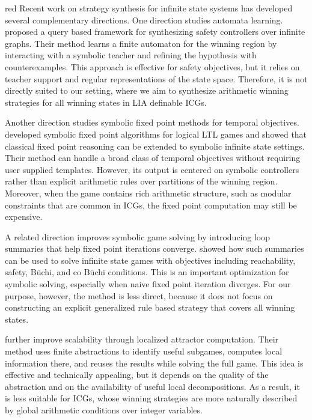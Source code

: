 \documentclass[review]{elsarticle}
\begin{document}
\begin{color}{red}
Recent work on strategy synthesis for infinite state systems has developed several complementary directions. One direction studies automata learning. 
\citet{NeiT2016} proposed a query based framework for synthesizing safety controllers over infinite graphs. 
Their method learns a finite automaton for the winning region by interacting with a symbolic teacher and refining the hypothesis with counterexamples. 
This approach is effective for safety objectives, but it relies on teacher support and regular representations of the state space. 
Therefore, it is not directly suited to our setting, where we aim to synthesize arithmetic winning strategies for all winning states in LIA definable ICGs.

Another direction studies symbolic fixed point methods for temporal objectives. 
\citet{StaDK2023} developed symbolic fixed point algorithms for logical LTL games and showed that classical fixed point reasoning can be extended to symbolic infinite state settings. 
Their method can handle a broad class of temporal objectives without requiring user supplied templates. 
However, its output is centered on symbolic controllers rather than explicit arithmetic rules over partitions of the winning region. 
Moreover, when the game contains rich arithmetic structure, such as modular constraints that are common in ICGs, the fixed point computation may still be expensive.

A related direction improves symbolic game solving by introducing loop summaries that help fixed point iterations converge. 
\citet{HeiR2024} showed how such summaries can be used to solve infinite state games with objectives including reachability, safety, B\"uchi, and co B\"uchi conditions. 
This is an important optimization for symbolic solving, especially when naive fixed point iteration diverges. 
For our purpose, however, the method is less direct, because it does not focus on constructing an explicit generalized rule based strategy that covers all winning states.

\citet{SchHDN2024} further improve scalability through localized attractor computation. 
Their method uses finite abstractions to identify useful subgames, computes local information there, and reuses the results while solving the full game. 
This idea is effective and technically appealing, but it depends on the quality of the abstraction and on the availability of useful local decompositions. 
As a result, it is less suitable for ICGs, whose winning strategies are more naturally described by global arithmetic conditions over integer variables.


\end{color}
\end{document}
